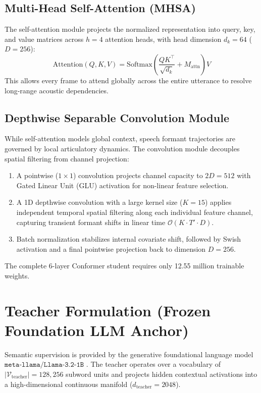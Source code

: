 \subsection{Multi-Head Self-Attention (MHSA)}
The self-attention module projects the normalized representation into query, key, and value matrices across $h = 4$ attention heads, with head dimension $d_k = 64$ ($D = 256$):
\begin{equation}
    \text{Attention}(Q, K, V) = \text{Softmax}\left(\frac{Q K^\top}{\sqrt{d_k}} + M_{\text{attn}}\right) V
\end{equation}
This allows every frame to attend globally across the entire utterance to resolve long-range acoustic dependencies.

\subsection{Depthwise Separable Convolution Module}
While self-attention models global context, speech formant trajectories are governed by local articulatory dynamics. The convolution module decouples spatial filtering from channel projection:
\begin{enumerate}
    \item A pointwise ($1 \times 1$) convolution projects channel capacity to $2D = 512$ with Gated Linear Unit (GLU) activation for non-linear feature selection.
    \item A 1D depthwise convolution with a large kernel size ($K = 15$) applies independent temporal spatial filtering along each individual feature channel, capturing transient formant shifts in linear time $\mathcal{O}(K \cdot T' \cdot D)$.
    \item Batch normalization stabilizes internal covariate shift, followed by Swish activation and a final pointwise projection back to dimension $D = 256$.
\end{enumerate}
The complete 6-layer Conformer student requires only 12.55 million trainable weights.

\section{Teacher Formulation (Frozen Foundation LLM Anchor)}
Semantic supervision is provided by the generative foundational language model $\texttt{meta-llama/Llama-3.2-1B}$ \cite{dubey2024llama3}. The teacher operates over a vocabulary of $|\mathcal{V}_{\text{teacher}}| = 128{,}256$ subword units and projects hidden contextual activations into a high-dimensional continuous manifold ($d_{\text{teacher}} = 2048$).

